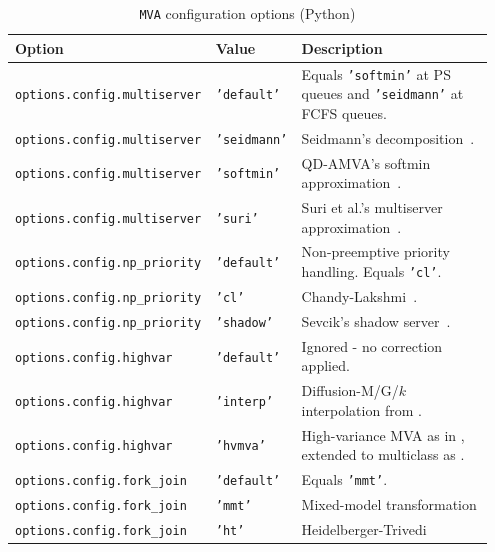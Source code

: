 \begin{PYTHON}
{
\begin{table}[thbp]
\footnotesize
\centering
\caption{\texttt{MVA} configuration options (Python)}
\begin{tabular}{|p{0.40\linewidth}|p{0.15\linewidth}|p{0.40\linewidth}|}
\hline
\textbf{Option} & \textbf{Value} & \textbf{Description}\\
\hline
\texttt{options.config.multiserver} & \texttt{'default'} & Equals \texttt{'softmin'} at PS queues and \texttt{'seidmann'} at FCFS queues.\\
\texttt{options.config.multiserver} & \texttt{'seidmann'} & Seidmann's decomposition~\cite{seidmann1987computerized}.\\
\texttt{options.config.multiserver} & \texttt{'softmin'} & QD-AMVA's softmin approximation~\cite{casale2015qdamva}.\\
\texttt{options.config.multiserver} & \texttt{'suri'} & Suri et al.'s multiserver approximation~\cite{suri2007approximate}.\\
\hline
\texttt{options.config.np\_priority} & \texttt{'default'} & Non-preemptive priority handling. Equals \texttt{'cl'}.\\
\texttt{options.config.np\_priority} & \texttt{'cl'} & Chandy-Lakshmi~\cite{EagL88}.\\
\texttt{options.config.np\_priority} & \texttt{'shadow'} & Sevcik's shadow server~\cite{Sev77}.\\
\hline
\texttt{options.config.highvar} & \texttt{'default'} & Ignored - no correction applied.\\
\texttt{options.config.highvar} & \texttt{'interp'} & Diffusion-M/G/$k$ interpolation from \cite{Casale2020a}.\\
\texttt{options.config.highvar} & \texttt{'hvmva'} & High-variance MVA as in \cite{BonW86}, extended to multiclass as \cite[Eq. 3.21]{Franks1996}.\\
\hline
\texttt{options.config.fork\_join} & \texttt{'default'} & Equals \texttt{'mmt'}. \\
\texttt{options.config.fork\_join} & \texttt{'mmt'} & Mixed-model transformation \cite{dobre24}\\
\texttt{options.config.fork\_join} & \texttt{'ht'} & Heidelberger-Trivedi~\cite{heidelberger1982queueing}\\
\hline
\end{tabular}
\label{TAB_MVA_config_PYTHON}
\end{table}
}
\end{PYTHON}

